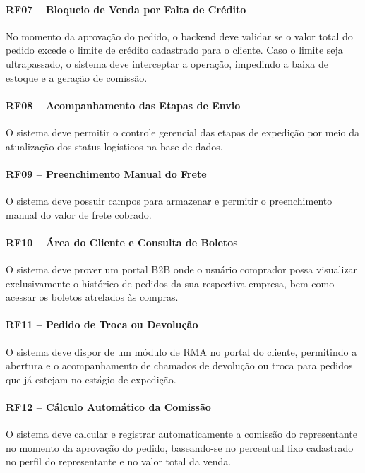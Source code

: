 \documentclass[12pt,a4paper]{article}
\begin{document}
\paragraph*{RF07 -- Bloqueio de Venda por Falta de Crédito}
No momento da aprovação do pedido, o backend deve validar se o valor total do pedido excede o limite de crédito cadastrado para o cliente. Caso o limite seja ultrapassado, o sistema deve interceptar a operação, impedindo a baixa de estoque e a geração de comissão.

\paragraph*{RF08 -- Acompanhamento das Etapas de Envio}
O sistema deve permitir o controle gerencial das etapas de expedição por meio da atualização dos status logísticos na base de dados.

\paragraph*{RF09 -- Preenchimento Manual do Frete}
O sistema deve possuir campos para armazenar e permitir o preenchimento manual do valor de frete cobrado.

\paragraph*{RF10 -- Área do Cliente e Consulta de Boletos}
O sistema deve prover um portal B2B onde o usuário comprador possa visualizar exclusivamente o histórico de pedidos da sua respectiva empresa, bem como acessar os boletos atrelados às compras.

\paragraph*{RF11 -- Pedido de Troca ou Devolução}
O sistema deve dispor de um módulo de RMA no portal do cliente, permitindo a abertura e o acompanhamento de chamados de devolução ou troca para pedidos que já estejam no estágio de expedição.

\paragraph*{RF12 -- Cálculo Automático da Comissão}
O sistema deve calcular e registrar automaticamente a comissão do representante no momento da aprovação do pedido, baseando-se no percentual fixo cadastrado no perfil do representante e no valor total da venda.
\end{document}
